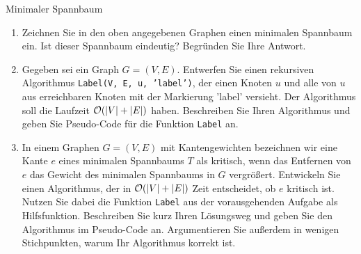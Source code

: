 \documentclass{article}
\begin{document}
\begin{exercise}{Minimaler Spannbaum}
  
  \begin{enumerate}
    \item Zeichnen Sie in den oben angegebenen Graphen einen minimalen Spannbaum ein. Ist dieser Spannbaum eindeutig? Begründen Sie Ihre Antwort.
    \item Gegeben sei ein Graph $G = (V,E)$. Entwerfen Sie einen rekursiven Algorithmus \texttt{Label(V, E, u, ’label’)}, der einen Knoten $u$ und alle von $u$ aus erreichbaren Knoten mit der Markierung ’label’ versieht. Der Algorithmus soll die Laufzeit $\mathcal{O}(|V| + |E|)$ haben. Beschreiben Sie Ihren Algorithmus und geben Sie Pseudo-Code für die Funktion \texttt{Label} an.
    \item In einem Graphen $G = (V,E)$ mit Kantengewichten bezeichnen wir eine Kante $e$ eines minimalen Spannbaums $T$ als kritisch, wenn das Entfernen von $e$ das Gewicht des minimalen Spannbaums in $G$ vergrößert. Entwickeln Sie einen Algorithmus, der in $\mathcal{O}(|V| + |E|)$ Zeit entscheidet, ob $e$ kritisch ist. Nutzen Sie dabei die Funktion \texttt{Label} aus der vorausgehenden Aufgabe als Hilfsfunktion. Beschreiben Sie kurz Ihren Lösungsweg und geben Sie den Algorithmus im Pseudo-Code an. Argumentieren Sie außerdem in wenigen Stichpunkten, warum Ihr Algorithmus korrekt ist.
  \end{enumerate}

  \begin{solution}

  \end{solution}
\end{exercise}
\end{document}
